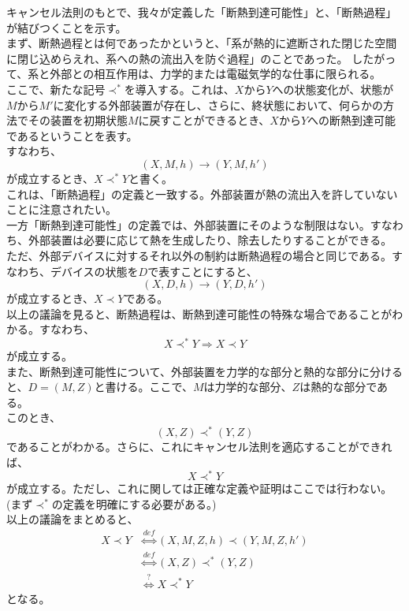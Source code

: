 \documentclass[a4paper,11pt]{jsarticle}
\begin{document}
キャンセル法則のもとで、我々が定義した「断熱到達可能性」と、「断熱過程」が結びつくことを示す。\\
まず、断熱過程とは何であったかというと、「系が熱的に遮断された閉じた空間に閉じ込めらえれ、系への熱の流出入を防ぐ過程」のことであった。
したがって、系と外部との相互作用は、力学的または電磁気学的な仕事に限られる。\\
ここで、新たな記号$\prec ^*$を導入する。これは、$X$から$Y$への状態変化が、状態が$M$から$M'$に変化する外部装置が存在し、さらに、終状態において、何らかの方法でその装置を初期状態$M$に戻すことができるとき、$X$から$Y$への断熱到達可能であるということを表す。\\
すなわち、
\begin{equation}
    (X,M,h) \rightarrow (Y,M,h')
\end{equation}
が成立するとき、$X \prec ^* Y$と書く。\\
これは、「断熱過程」の定義と一致する。外部装置が熱の流出入を許していないことに注意されたい。\\

一方「断熱到達可能性」の定義では、外部装置にそのような制限はない。すなわち、外部装置は必要に応じて熱を生成したり、除去したりすることができる。\\
ただ、外部デバイスに対するそれ以外の制約は断熱過程の場合と同じである。すなわち、デバイスの状態を$D$で表すことにすると、
\begin{equation}
    (X,D,h) \rightarrow (Y,D,h')
\end{equation}
が成立するとき、$X \prec Y$である。\\

以上の議論を見ると、断熱過程は、断熱到達可能性の特殊な場合であることがわかる。すなわち、
\begin{equation}
    X \prec ^* Y \Rightarrow X \prec Y
\end{equation}
が成立する。\\
また、断熱到達可能性について、外部装置を力学的な部分と熱的な部分に分けると、$D = (M,Z)$と書ける。ここで、$M$は力学的な部分、$Z$は熱的な部分である。\\
このとき、
\begin{equation}
    (X,Z) \prec^* (Y,Z)
\end{equation}
であることがわかる。さらに、これにキャンセル法則を適応することができれば、
\begin{equation}
    X \prec^* Y
\end{equation}
が成立する。ただし、これに関しては正確な定義や証明はここでは行わない。(まず$\prec^*$の定義を明確にする必要がある。)\\
以上の議論をまとめると、
\begin{align}
    X \prec Y & \overset{def}{\Leftrightarrow} (X,M,Z,h) \prec (Y,M,Z,h')\\
    &\overset{def}{\Leftrightarrow} (X,Z) \prec^* (Y,Z)\\
    &\overset{?}{\Leftrightarrow} X \prec^* Y
\end{align}
となる。\\
\end{document}
